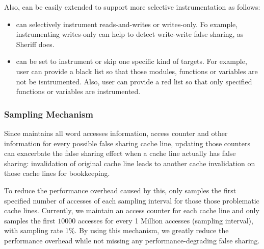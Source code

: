 Also,  can be easily extended to support more selective instrumentation as follows:
\begin{itemize}
\item
\Defaults{} can selectively instrument reads-and-writes or writes-only. Fo example, instrumenting writes-only can help to detect write-write false sharing, as Sheriff does. 
\item
\Defaults{} can be set to instrument or skip one specific kind of targets. For example, user can provide a black list so that those modules,
functions or variables are not be isntrumented. Also, user can provide a red list so that only specified functions or variables are instrumented. 
\end{itemize}

\subsubsection{Sampling Mechanism}
Since  maintains all word accesses information, access counter and other information for 
every possible false sharing cache line, 
updating those counters 
can exacerbate the false sharing effect when a cache line actually has false
sharing: invalidation of original cache line leads to another cache invalidation on
those cache lines for bookkeeping.


To reduce the performance overhead caused by this,  only samples the first specified
number of accesses of each sampling interval for those those problematic cache lines. 
Currently, we maintain an access counter for each cache line and only samples the first $10000$ accesses 
for every 1 Million accesses (sampling interval), with sampling rate 1\%. By using this mechanism, 
we greatly reduce the performance overhead while not missing any performance-degrading false sharing.  

